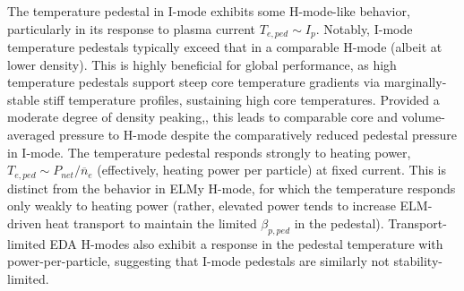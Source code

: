 \documentclass[ twoside,openright,titlepage,numbers=noenddot,headinclude,%
                footinclude=true,cleardoublepage=empty,abstractoff, %
                BCOR=5mm,paper=letter,fontsize=11pt,%
                ngerman,american,%
                ]{scrreprt}
\newcommand{\gnote}[1]{\graffito{\textcolor{red}{#1}}}
\begin{document}
The temperature pedestal in I-mode exhibits some H-mode-like behavior, particularly in its response to plasma current $T_{e,ped} \sim I_p$.  Notably, I-mode temperature pedestals typically exceed that in a comparable H-mode (albeit at lower density).  This is highly beneficial for global performance, as high temperature pedestals support steep core temperature gradients via marginally-stable stiff temperature profiles, sustaining high core temperatures.  Provided a moderate degree of density peaking,\gnote{ref if we include this}, this leads to comparable core and volume-averaged pressure to H-mode despite the comparatively reduced pedestal pressure in I-mode.  The temperature pedestal responds strongly to heating power, $T_{e,ped} \sim P_{net}/\overline{n}_e$ (effectively, heating power per particle) at fixed current.  This is distinct from the behavior in ELMy H-mode, for which the temperature responds only weakly to heating power (rather, elevated power tends to increase ELM-driven heat transport to maintain the limited $\beta_{p,ped}$ in the pedestal).  Transport-limited EDA H-modes also exhibit a response in the pedestal temperature with power-per-particle, suggesting that I-mode pedestals are similarly not stability-limited.

\end{document}
